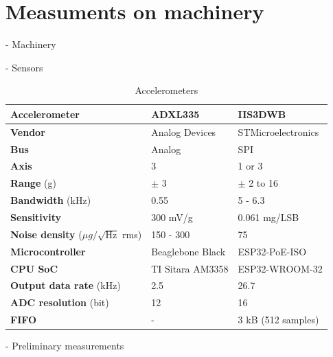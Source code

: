 \section{Measuments on machinery}
- Machinery

- Sensors

\begin{table}[ht]
\renewcommand{\arraystretch}{1.2}
\begin{tabular}{|l|l|l|}
\hline
\textbf{Accelerometer}                           & \textbf{ADXL335} & \textbf{IIS3DWB}   \\ \hline
\textbf{Vendor}                                  & Analog Devices   & STMicroelectronics \\ \hline
\textbf{Bus}                                     & Analog           & SPI                \\ \hline
\textbf{Axis}                                    & 3                & 1 or 3             \\ \hline
\textbf{Range} (g)                               & $\pm$ 3          & $\pm$ 2 to 16      \\ \hline
\textbf{Bandwidth} (kHz)                         & 0.55             & 5 - 6.3            \\ \hline
\textbf{Sensitivity}                             & 300 mV/g         & 0.061 mg/LSB       \\ \hline
\textbf{Noise density} ($\mu g / \sqrt{\mathrm{Hz}}$ rms) & 150 - 300        & 75                 \\ \hline
\textbf{Microcontroller}                         & Beaglebone Black & ESP32-PoE-ISO      \\ \hline
\textbf{CPU SoC}                                 & TI Sitara AM3358 & ESP32-WROOM-32     \\ \hline
\textbf{Output data rate} (kHz)                  & 2.5              & 26.7               \\ \hline
\textbf{ADC resolution} (bit)                    & 12               & 16                 \\ \hline
\textbf{FIFO}                                    & -                & 3 kB (512 samples) \\ \hline
\end{tabular}
\caption{Accelerometers}
\end{table}

- Preliminary measurements


